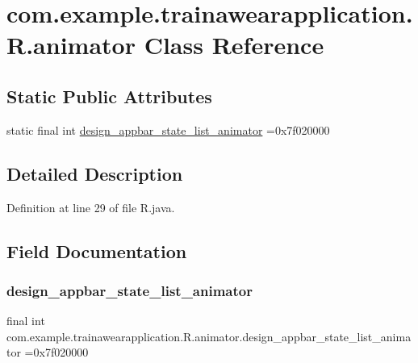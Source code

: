 \hypertarget{classcom_1_1example_1_1trainawearapplication_1_1_r_1_1animator}{}\section{com.\+example.\+trainawearapplication.\+R.\+animator Class Reference}
\label{classcom_1_1example_1_1trainawearapplication_1_1_r_1_1animator}
\subsection*{Static Public Attributes}
\begin{DoxyCompactItemize}
\item 
static final int \mbox{\hyperlink{classcom_1_1example_1_1trainawearapplication_1_1_r_1_1animator_a342dc81b170f7676d8031e7460f089be}{design\+\_\+appbar\+\_\+state\+\_\+list\+\_\+animator}} =0x7f020000
\end{DoxyCompactItemize}


\subsection{Detailed Description}


Definition at line 29 of file R.\+java.



\subsection{Field Documentation}
\mbox{\label{classcom_1_1example_1_1trainawearapplication_1_1_r_1_1animator_a342dc81b170f7676d8031e7460f089be}} 
\subsubsection{\texorpdfstring{design\_appbar\_state\_list\_animator}{design\_appbar\_state\_list\_animator}}
{\footnotesize\ttfamily final int com.\+example.\+trainawearapplication.\+R.\+animator.\+design\+\_\+appbar\+\_\+state\+\_\+list\+\_\+animator =0x7f020000\hspace{0.3cm}{\ttfamily [static]}}



